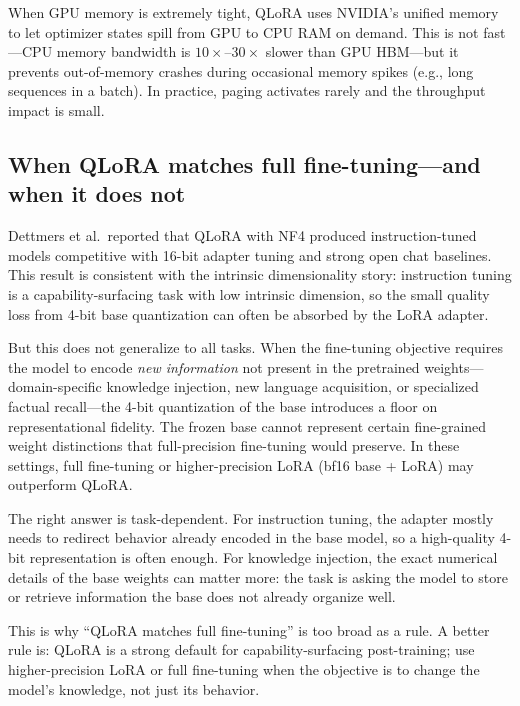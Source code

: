 When GPU memory is extremely tight, QLoRA uses NVIDIA's unified memory to let optimizer states spill from GPU to CPU RAM on demand. This is not fast---CPU memory bandwidth is $10\times$--$30\times$ slower than GPU HBM---but it prevents out-of-memory crashes during occasional memory spikes (e.g., long sequences in a batch). In practice, paging activates rarely and the throughput impact is small.

\subsection{When QLoRA matches full fine-tuning---and when it does not}

Dettmers et al.\ reported that QLoRA with NF4 produced instruction-tuned models competitive with 16-bit adapter tuning and strong open chat baselines. This result is consistent with the intrinsic dimensionality story: instruction tuning is a capability-surfacing task with low intrinsic dimension, so the small quality loss from 4-bit base quantization can often be absorbed by the LoRA adapter.

But this does not generalize to all tasks. When the fine-tuning objective requires the model to encode \emph{new information} not present in the pretrained weights---domain-specific knowledge injection, new language acquisition, or specialized factual recall---the 4-bit quantization of the base introduces a floor on representational fidelity. The frozen base cannot represent certain fine-grained weight distinctions that full-precision fine-tuning would preserve. In these settings, full fine-tuning or higher-precision LoRA (bf16 base + LoRA) may outperform QLoRA.

\begin{tcolorbox}[colback=blue!5, colframe=blue!60, title=\textbf{Does 4-bit Quantization Throw Away What Fine-Tuning Needs?}]
The right answer is task-dependent. For instruction tuning, the adapter mostly needs to redirect behavior already encoded in the base model, so a high-quality 4-bit representation is often enough. For knowledge injection, the exact numerical details of the base weights can matter more: the task is asking the model to store or retrieve information the base does not already organize well.

\medskip
This is why ``QLoRA matches full fine-tuning'' is too broad as a rule. A better rule is: QLoRA is a strong default for capability-surfacing post-training; use higher-precision LoRA or full fine-tuning when the objective is to change the model's knowledge, not just its behavior.
\end{tcolorbox}

